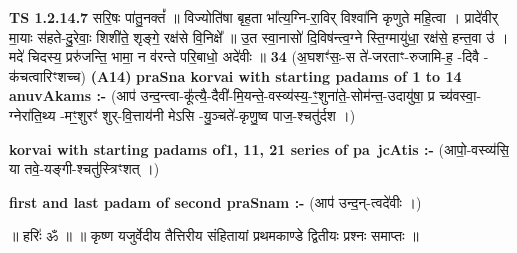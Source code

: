 \documentclass[17pt]{extarticle}
\begin{document}
                  \newline
                                \textbf{ TS 1.2.14.7} \newline
                  सरि॒षः पा॑तु॒नक्तं᳚ ॥ विज्योति॑षा बृह॒ता भा᳚त्य॒ग्नि-रा॒विर् विश्वा॑नि कृणुते महि॒त्वा । प्रादे॑वीर् मा॒याः स॑हते-दु॒रेवाः॒ शिशी॑ते॒ शृङ्गे॒ रक्ष॑से वि॒निक्षे᳚ ॥ उ॒त स्वा॒नासो॑ दि॒विष॑न्त्व॒ग्ने स्ति॒ग्मायु॑धा॒ रक्ष॑से॒ हन्त॒वा उ॑ । मदे॑ चिदस्य॒ प्ररु॑जन्ति॒ भामा॒ न व॑रन्ते परि॒बाधो॒ अदे॑वीः ॥ \textbf{  34} \newline
                  \newline
                      (अ॒घशꣳ॑सः॒-स ते॑-जरताꣳ-रुजामि-ह॒ -दिवै - क॑चत्वारिꣳशच्च)  \textbf{(A14)} \newline \newline
                \textbf{praSna korvai with starting padams of 1 to 14 anuvAkams :-} \newline
        (आप॑ उन्द॒न्त्वा-कू᳚त्यै॒-दैवी॑-मि॒यन्ते॒-वस्व्य॑स्य॒-ꣳ॒शुना॑ते॒-सोम॑न्त॒-उदायु॑षा॒ प्र च्य॑वस्वा॒- ग्नेरा॑ति॒थ्य -मꣳ॒॒शुरꣳ॑ शुर्-वि॒त्ताय॑नी मेऽसि -यु॒ञ्चते॑-कृणु॒ष्व पाज॒-श्चतु॑र्दश ।) \newline

        \textbf{korvai with starting padams of1, 11, 21 series of pa~jcAtis :-} \newline
        (आपो॒-वस्व्य॑सि॒ या तवे॒-यङ्गी-श्चतु॑स्त्रिꣳशत् ।) \newline

        \textbf{first and last padam of second praSnam :-} \newline
        (आप॑ उन्द॒न्-त्वदे॑वीः ।) \newline 

        
        ॥ हरिः॑ ॐ ॥
॥ कृष्ण यजुर्वेदीय तैत्तिरीय संहितायां प्रथमकाण्डे द्वितीयः प्रश्नः समाप्तः ॥ \newline
        \pagebreak
                \pagebreak
        
\end{document}
